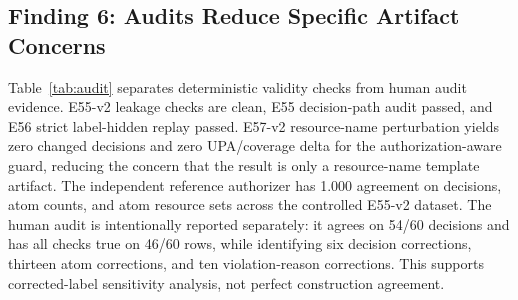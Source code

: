 \subsection{Finding 6: Audits Reduce Specific Artifact Concerns}



Table~\ref{tab:audit} separates deterministic validity checks from human audit evidence. E55-v2 leakage checks are clean, E55 decision-path audit passed, and E56 strict label-hidden replay passed. E57-v2 resource-name perturbation yields zero changed decisions and zero UPA/coverage delta for the authorization-aware guard, reducing the concern that the result is only a resource-name template artifact. The independent reference authorizer has 1.000 agreement on decisions, atom counts, and atom resource sets across the controlled E55-v2 dataset. The human audit is intentionally reported separately: it agrees on 54/60 decisions and has all checks true on 46/60 rows, while identifying six decision corrections, thirteen atom corrections, and ten violation-reason corrections. This supports corrected-label sensitivity analysis, not perfect construction agreement.
